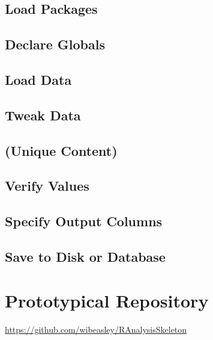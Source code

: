 \documentclass[]{book}
\begin{document}
\hypertarget{load-packages}{%
\section{Load Packages}\label{load-packages}}

\hypertarget{declare-globals}{%
\section{Declare Globals}\label{declare-globals}}

\hypertarget{load-data}{%
\section{Load Data}\label{load-data}}

\hypertarget{tweak-data}{%
\section{Tweak Data}\label{tweak-data}}

\hypertarget{unique-content}{%
\section{(Unique Content)}\label{unique-content}}

\hypertarget{verify-values}{%
\section{Verify Values}\label{verify-values}}

\hypertarget{specify-output-columns}{%
\section{Specify Output Columns}\label{specify-output-columns}}

\hypertarget{save-to-disk-or-database}{%
\section{Save to Disk or Database}\label{save-to-disk-or-database}}

\hypertarget{repo-prototype}{%
\chapter{Prototypical Repository}\label{repo-prototype}}

\url{https://github.com/wibeasley/RAnalysisSkeleton}
\end{document}

